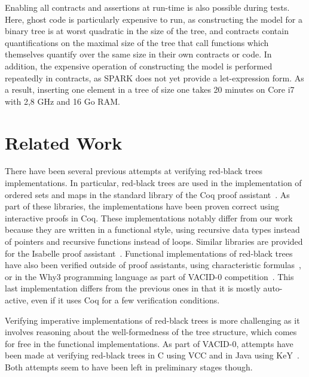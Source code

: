 \documentclass{llncs}
\begin{document}
Enabling all contracts and assertions at run-time is also possible during
tests. Here, ghost code is particularly expensive to run, as constructing the
model for a binary tree is at worst quadratic in the size of the tree, and
contracts contain quantifications on the maximal size of the tree that call
functions which themselves quantify over the same size in their own contracts
or code. In addition, the expensive operation of constructing the model is
performed repeatedly in contracts, as SPARK does not yet provide a
let-expression form.  As a result, inserting one element in a tree of size one
takes 20 minutes on Core i7 with 2,8 GHz and 16 Go RAM.

\section{Related Work}
\label{related-work}
There have been several previous attempts at verifying red-black trees implementations. In particular, red-black trees are
used in the implementation of ordered sets and maps in the standard library of the Coq proof
assistant~\cite{appel2011efficient,filliatre2004functors}. As part of these libraries, the implementations have been proven
correct using interactive proofs in Coq. These implementations notably differ from our work because they are written in
a functional style, using recursive data types instead of pointers and recursive functions instead of loops. Similar
libraries are provided for the Isabelle proof assistant~\cite{lammich2010isabelle}. Functional implementations of
red-black trees have also been verified outside of proof assistants, using characteristic formulas~\cite{chargueraud2010program},
or in the Why3 programming language as part of VACID-0 competition~\cite{leino2010vacid}. This last implementation differs from
the previous ones in that it is mostly auto-active, even if it uses Coq for a few verification conditions.

Verifying imperative implementations of red-black trees is more challenging as it involves reasoning about the well-formedness
of the tree structure, which comes for free in the functional implementations. As part of VACID-0, attempts have been made at
verifying red-black trees in C using VCC and in Java using KeY~\cite{bruns2011specification}.
Both attempts seem to have been left in preliminary stages
though.
\end{document}
